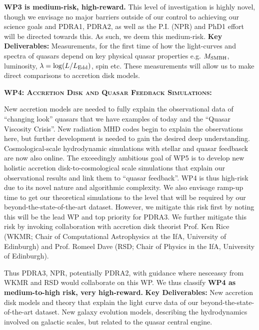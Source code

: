 \smallskip
\smallskip
\noindent
{\bf WP3 is medium-risk, high-reward.}  
This level of investigation is highly novel, though we envisage no
major barriers outside of our control to achieving our science goals
and PDRA1, PDRA2, as well as the P.I. (NPR) and PhD1 effort will be
directed towards this.
As such, we deem this medium-risk.  {\bf Key Deliverables:}
Measurements, for the first time of how the light-curves and spectra
of quasars depend on key physical quasar properties e.g. $M_{\rm
SMBH}$, luminosity, $\lambda = \log (L / L_{\rm Edd})$, spin etc.
These measurements will allow us to make direct comparisons to
accretion disk models.



\medskip 
\medskip
\smallskip
\smallskip
\noindent
\textbf{\textsc{WP4: Accretion Disk and Quasar Feedback Simulations:}} 

\smallskip
\smallskip
\noindent
New accretion models are needed to fully explain the observational
data of ``changing look'' quasars that we have examples of today and
the ``Quasar Viscosity Crisis''. New radiation MHD codes begin to
explain the observations here, but further development is needed to
gain the desired deep understanding. Cosmological-scale hydrodynamic
simulations with stellar and quasar feedbasck are now also online. The
exceedingly ambitious goal of WP5 is to develop new holistic accretion
disk-to-cosmological scale simulations that explain our observational
results and link them to ``quasar feedback''.  WP4 is thus high-risk
due to its novel nature and algorithmic complexity.  We also envisage
ramp-up time to get our theoretical simulations to the level that will
be required by our beyond-the-state-of-the-art dataset.  However, we
mitigate this risk first by noting this will be the lead WP and top
priority for PDRA3.  We further mitigate this risk by invoking
collaboration with accretion disk theorist Prof. Ken Rice (WKMR; Chair
of Computational Astrophysics at the IfA, University of Edinburgh) and
Prof. Romeel Dave (RSD; Chair of Physics in the IfA, University of
Edinburgh).

\smallskip
\smallskip
\noindent
Thus PDRA3, NPR, potentially PDRA2, with guidance where nesceassy from
WKMR and RSD would collaborate on this WP.  We thus classify {\bf WP4
as medium-to-high risk, very high-reward.}  {\bf Key Deliverables:}
New accretion disk models and theory that explain the light curve data
of our beyond-the-state-of-the-art dataset.  New galaxy evolution
models, describing the hydrodynamics involved on galactic scales, but
related to the quasar central engine.



